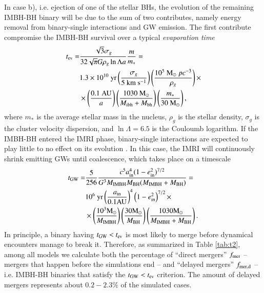 \documentclass[article]{aa}
\newcommand{\Ms}{{\rm M}_\odot}
\newcommand{\au}{{\rm AU}}
\newcommand{\gw}{{\rm GW}}
\newcommand{\ibh}{{\rm IMBH}}
\newcommand{\inn}{{\rm in}}
\newcommand{\bh}{{\rm BH}}
\begin{document}
{In case b), i.e. ejection of one of the stellar BHs, the evolution of the remaining IMBH-BH binary will be due to the sum of two contributes, namely energy removal from binary-single interactions and GW emission. The first contribute compromise the IMBH-BH survival over a typical {\it evaporation time} \citep{bt,stephan16,hoang18} 
\begin{align}
t_{\rm ev} =& \frac{\sqrt{3}\sigma_g}{32\sqrt{\pi}G\rho_g\ln\Lambda a} \frac{m}{m_*} = \nonumber \\
            & 1.3\times 10^{10} {\rm ~yr} 
            \left(\frac{\sigma_g}{5{\rm ~km~s^{-1}}}\right)
            \left(\frac{10^5{\rm ~M}_\odot ~pc^{-3}}{\rho_g}\right) \times \nonumber \\
            & \times \left(\frac{0.1{\rm ~AU}}{a}\right)\left(\frac{1030{\rm ~M}_\odot}{M_{\rm ibh}+M_{\rm bh}}\right)\left(\frac{m_*}{30{\rm ~M}_\odot}\right),
\label{eva}
\end{align}
where $m_*$ is the average stellar mass in the nucleus, $\rho_g$ is the stellar density, $\sigma_g$ is the cluster velocity dispersion, and $\ln\Lambda=6.5$ is the Couloumb logarithm. If the IMBH-BH entered the IMRI phase, binary-single interactions are expected to play little to no effect on its evolution \citep{seoane18}. In this case, the IMRI will continuously shrink emitting GWs until coalescence, which takes place on a timescale \citep{peters64}
\begin{align}
t_\gw =&  \displaystyle \frac{5}{256}\frac{c^5 a_\inn^4 (1-e_\inn^2)^{7/2}}{G^3M_\ibh M_\bh(M_\ibh+M_\bh)} = \nonumber \\
       & 10^6{\rm ~yr}\left(\frac{a_\inn}{0.1\au}\right)^4\left(1-e_\inn^2\right)^{7/2}\times \nonumber \\ 
       & \times \left(\frac{10^3\Ms}{M_\ibh}\right) \left(\frac{30\Ms}{M_\bh}\right)\left(\frac{1030\Ms}{M_\ibh+M_\bh}\right).
\label{peters}
\end{align}
In principle, a binary having $t_\gw < t_{\rm ev}$ is most likely to merge before dynamical encounters manage to break it.
Therefore, as summarized in Table \ref{tab:t2}, among all models we calculate both the percentage of ``direct mergers'' $f_{\rm mer}$ -- mergers that happen before the simulations end -- and ``delayed mergers'' $f_{\rm mer,d}$ -- i.e. IMBH-BH binaries that satisfy the $t_\gw < t_{\rm ev}$ criterion. The amount of delayed mergers represents about $0.2-2.3\%$ of the simulated cases. 

}
\end{document}
